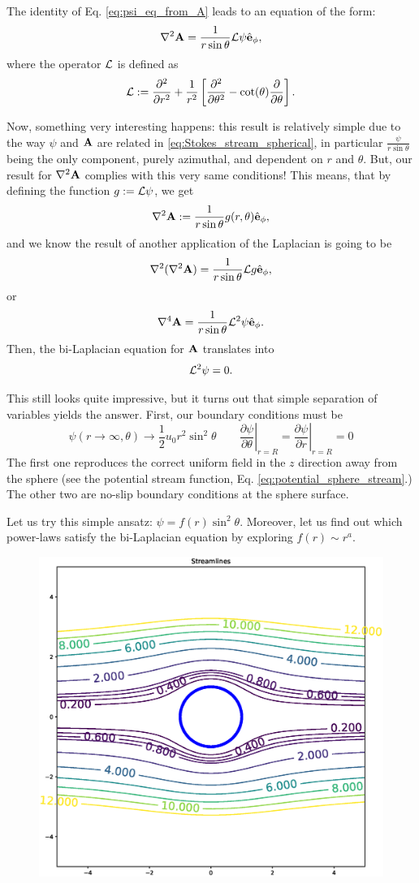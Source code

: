 The identity of Eq. \ref{eq:psi_eq_from_A} leads to an equation
of the form:
\[
  \nabla^2\mathbf{A} = \frac{1}{r \sin\theta} {\cal L} \psi  \hat{\mathbf{e}}_\phi ,
\]
where the operator $\cal L$ is defined as
\[
  {\cal L} :=
  \frac{\partial^2  }{\partial r^2} +
  \frac{1}{r^2} \left[
    \frac{\partial^2 }{\partial \theta^2} - 
    \cot(\theta) \frac{\partial }{\partial \theta}
  \right] .
\]

Now, something very interesting happens: this result is relatively
simple due to the way $\psi$ and $\mathbf{A}$ are related in
\ref{eq:Stokes_stream_spherical}, in particular
$\frac{\psi}{r \sin\theta}$ being the only component, purely
azimuthal, and dependent on $r$ and $\theta$.  But, our result for
$\nabla^2\mathbf{A}$ complies with this very same conditions!  This means,
that by defining the function $g:=  {\cal L} \psi $, we get
\[
  \nabla^2\mathbf{A} := \frac{1}{r \sin\theta} g(r,\theta) \hat{\mathbf{e}}_\phi ,
\]
and we know the result of another application of the Laplacian is
going to be
\[
  \nabla^2( \nabla^2\mathbf{A}) = \frac{1}{r \sin\theta} {\cal L} g  \hat{\mathbf{e}}_\phi ,
\]
or
\[
  \nabla^4\mathbf{A} = \frac{1}{r \sin\theta} {\cal L}^2 \psi \hat{\mathbf{e}}_\phi .
\]
Then, the bi-Laplacian equation for $\mathbf{A}$ translates into
\[
  {\cal L}^2 \psi = 0.
\]

This still looks quite impressive, but it turns out that simple
separation of variables yields the answer. First, our boundary
conditions must be
\[
  \psi(r \to \infty ,\theta) \to \frac12 u_0 r^2 \sin^2\theta
  \qquad
  \left.\frac{\partial \psi}{\partial \theta}\right|_{r=R} =
  \left.\frac{\partial \psi}{\partial r}\right|_{r=R} = 0
\]
The first one reproduces the correct uniform field in the $z$
direction away from the sphere (see the potential stream function,
Eq. \ref{eq:potential_sphere_stream}.) The other two are no-slip
boundary conditions at the sphere surface.

Let us try this simple ansatz: $\psi=f(r) \sin^2\theta$. Moreover, let
us find out which power-laws satisfy the bi-Laplacian equation by
exploring $f(r) \sim r^a$.


\begin{figure}
  \centering
  \includegraphics[width=0.8\linewidth]{figures/creeping_flow_past_sphere}
  \caption{\label{fig:creeping_flow_past_sphere}}
\end{figure}


